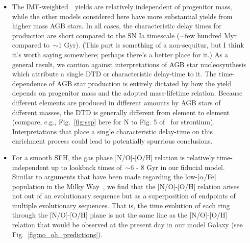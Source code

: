 \documentclass[ms.tex]{subfiles}
\begin{document}
\begin{itemize}
	\item The IMF-weighted~\cristallo~yields are relatively independent of 
	progenitor mass, while the other models considered here have more 
	substantial yields from higher mass AGB stars. 
	In all cases, the characteristic delay times for production are short 
	compared to the SN Ia timescale ($\sim$few hundred Myr compared to~$\sim$1 
	Gyr). 
	{\color{red} 
	(This part is something of a non-sequitur, but I think it's worth saying 
	somewhere; perhaps there's a better place for it.) 
	As a general result, we caution against interpretations of AGB star 
	nucleosynthesis which attribute a single DTD or characteristic delay-time 
	to it. 
	The time-dependence of AGB star production is entirely dictated by how the 
	yield depends on progenitor mass and the adopted mass-lifetime relation. 
	Because different elements are produced in different amounts by AGB stars 
	of different masses, the DTD is generally different from element to 
	element (compare, e.g., Fig.~\ref{fig:ssp} here for N to Fig. 5 
	of~\citealt{Johnson2020} for strontium). 
	Interpretations that place a single characteristic delay-time on this 
	enrichment process could lead to potentially spurrious conclusions. 
	}

	\item For a smooth SFH, the gas phase [N/O]-[O/H] relation is relatively 
	time-independent up to lookback times of~$\sim$6 - 8 Gyr in our fiducial 
	model. 
	Similar to arguments that have been made regarding the low-[$\alpha$/Fe] 
	population in the Milky Way~\citep[e.g.][]{Schoenrich2009, Sharma2020, 
	Johnson2021}, we find that the [N/O]-[O/H] relation arises not out of an 
	evolutionary sequence but as a superposition of endpoints of multiple 
	evolutionary sequences. 
	That is, the time evolution of each ring through the [N/O]-[O/H] plane is 
	not the same line as the [N/O]-[O/H] relation that would be observed at the 
	present day in our model Galaxy (see Fig.~\ref{fig:no_oh_predictions}). 


\end{itemize}
\end{document}
